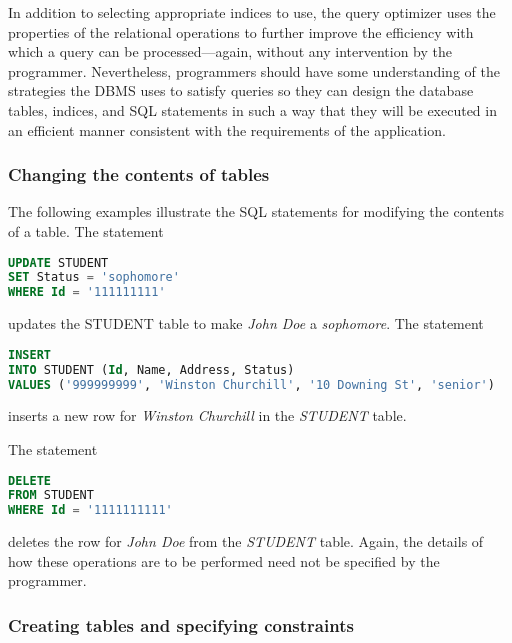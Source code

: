 \documentclass[]{article}
\begin{document}
In addition to selecting appropriate indices to use, the query optimizer
uses the properties of the relational operations to further improve the
efficiency with which a query can be processed---again, without any
intervention by the programmer. Nevertheless, programmers should have
some understanding of the strategies the DBMS uses to satisfy queries so
they can design the database tables, indices, and SQL statements in such
a way that they will be executed in an efficient manner consistent with
the requirements of the application.

\hypertarget{changing-the-contents-of-tables}{%
\subsubsection{Changing the contents of
tables}\label{changing-the-contents-of-tables}}

The following examples illustrate the SQL statements for modifying the
contents of a table. The statement

\begin{lstlisting}[language=SQL]
UPDATE STUDENT
SET Status = 'sophomore'
WHERE Id = '111111111' 
\end{lstlisting}

updates the STUDENT table to make \emph{John Doe} a \emph{sophomore}.
The statement

\begin{lstlisting}[language=SQL]
INSERT 
INTO STUDENT (Id, Name, Address, Status) 
VALUES ('999999999', 'Winston Churchill', '10 Downing St', 'senior') 
\end{lstlisting}

inserts a new row for \emph{Winston Churchill} in the \emph{STUDENT}
table.

The statement

\begin{lstlisting}[language=SQL]
DELETE 
FROM STUDENT 
WHERE Id = '1111111111'
\end{lstlisting}

deletes the row for \emph{John Doe} from the \emph{STUDENT} table.
Again, the details of how these operations are to be performed need not
be specified by the programmer.

\hypertarget{creating-tables-and-specifying-constraints}{%
\subsubsection{Creating tables and specifying
constraints}\label{creating-tables-and-specifying-constraints}}
\end{document}
